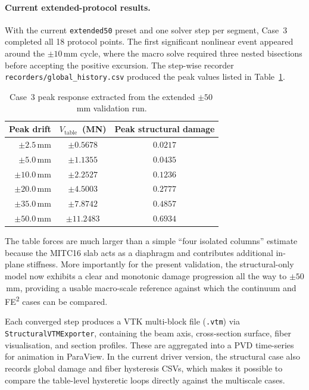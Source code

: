 \paragraph{Current extended-protocol results.}
With the current \texttt{extended50} preset and one solver step per segment,
Case~3 completed all 18 protocol points.  The first significant nonlinear
event appeared around the $\pm 10$\,mm cycle, where the macro solve required
three nested bisections before accepting the positive excursion.  The
step-wise recorder \texttt{recorders/global\_history.csv} produced the peak
values listed in Table~\ref{tab:case3-extended50-peaks}.

\begin{table}[htbp]
\centering
\begin{tabular}{rcc}
\toprule
\textbf{Peak drift} & $V_{\text{table}}$~(MN) & Peak structural damage \\
\midrule
$\pm 2.5$\,mm  & $\pm 0.5678$ & $0.0217$ \\
$\pm 5.0$\,mm  & $\pm 1.1355$ & $0.0435$ \\
$\pm 10.0$\,mm & $\pm 2.2527$ & $0.1236$ \\
$\pm 20.0$\,mm & $\pm 4.5003$ & $0.2777$ \\
$\pm 35.0$\,mm & $\pm 7.8742$ & $0.4857$ \\
$\pm 50.0$\,mm & $\pm 11.2483$ & $0.6934$ \\
\bottomrule
\end{tabular}
\caption{Case~3 peak response extracted from the extended
  \(\pm 50\)\,mm validation run.}
\label{tab:case3-extended50-peaks}
\end{table}

\noindent
The table forces are much larger than a simple ``four isolated columns''
estimate because the MITC16 slab acts as a diaphragm and contributes
additional in-plane stiffness.  More importantly for the present validation,
the structural-only model now exhibits a clear and monotonic damage progression
all the way to $\pm 50$\,mm, providing a usable macro-scale reference against
which the continuum and FE\textsuperscript{2} cases can be compared.

Each converged step produces a VTK multi-block file
(\texttt{.vtm}) via \texttt{StructuralVTMExporter}, containing the
beam axis, cross-section surface, fiber visualisation, and section
profiles.  These are aggregated into a PVD time-series
for animation in ParaView.  In the current driver version, the structural case
also records global damage and fiber hysteresis CSVs, which makes it possible
to compare the table-level hysteretic loops directly against the multiscale
cases.


